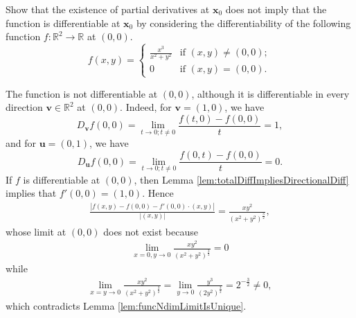 \begin{exc}
  Show that the existence of partial derivatives at $\mathbf{x}_0$
  does not imply that the function is differentiable at $\mathbf{x}_0$
  by considering the differentiability of
  the following function $f: \mathbb{R}^2\rightarrow \mathbb{R}$
  at $(0,0)$. 
  \begin{displaymath}
    f(x,y) =
    \begin{cases}
      \frac{x^3}{x^2+y^2} & \text{if } (x,y)\ne (0,0);
      \\
      0 & \text{if } (x,y)= (0,0).
    \end{cases}
  \end{displaymath}
\end{exc}
\begin{solution}
  The function is not differentiable at $(0,0)$,
  although it is differentiable in every direction $\mathbf{v}\in
  \mathbb{R}^2$ at $(0,0)$.
  Indeed, for $\mathbf{v}=(1,0)$, we have
  \begin{displaymath}
    D_{\mathbf{v}} f (0,0) = \lim_{t\rightarrow0;t\neq 0} \frac{f(t,0)-f(0,0)}{t}
    = 1,
  \end{displaymath}
  and for $\mathbf{u}=(0,1)$, we have
  \begin{displaymath}
    D_{\mathbf{u}} f (0,0) = \lim_{t\rightarrow0;t\neq 0} \frac{f(0,t)-f(0,0)}{t}
    = 0.
  \end{displaymath}
  If $f$ is differentiable at $(0,0)$, then Lemma
  \ref{lem:totalDiffImpliesDirectionalDiff} implies that
  $f'(0,0)=(1,0)$. Hence
  \begin{align*}
    \frac{|f(x,y)-f(0,0)-f'(0,0)\cdot (x,y)|}{|(x,y)|}
    =\frac{xy^{2}}{(x^{2}+y^{2})^{\frac{3}{2}}},
  \end{align*}
  whose limit at $(0,0)$ does not exist because
  \begin{align*}
    \lim_{x=0,y\rightarrow0}\frac{xy^{2}}{(x^{2}+y^{2})^{\frac{3}{2}}}=0
  \end{align*}
  while
  \begin{align*}
    \lim_{x=y\rightarrow0}\frac{xy^{2}}{(x^{2}+y^{2})^{\frac{3}{2}}}
    =\lim_{y\rightarrow0}\frac{y^{3}}{(2y^{2})^{\frac{3}{2}}}
    =2^{-\frac{3}{2}}\neq 0,
  \end{align*}
  which contradicts Lemma \ref{lem:funcNdimLimitIsUnique}.
\end{solution}

